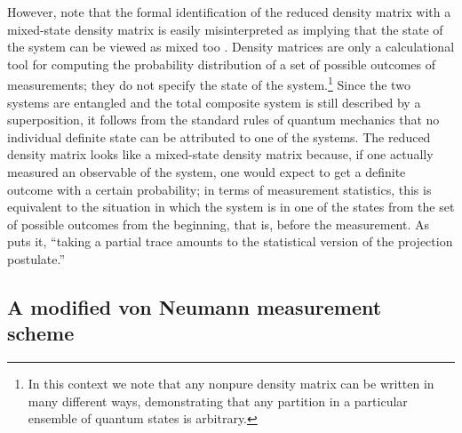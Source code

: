 \documentclass[rmp,aps,amsmath,amsfonts,noshowkeys,noshowpacs,12pt]{revtex4}
\begin{document}
However, note that the formal identification of the reduced density
matrix with a mixed-state density matrix is easily misinterpreted as
implying that the state of the system can be viewed as mixed too
\citep[see also the discussion by][]{Espagnat:1988:cf}.  Density
matrices are only a calculational tool for computing the probability
distribution of a set of possible outcomes of measurements; they do
not specify the state of the system.\footnote{In this context we note
  that any nonpure density matrix can be written in many different
  ways, demonstrating that any partition in a particular ensemble of
  quantum states is arbitrary.}  Since the two systems are entangled
and the total composite system is still described by a superposition,
it follows from the standard rules of quantum mechanics that no
individual definite state can be attributed to one of the systems. The
reduced density matrix looks like a mixed-state density matrix
because, if one actually measured an observable of the system, one
would expect to get a definite outcome with a certain probability; in
terms of measurement statistics, this is equivalent to the situation
in which the system is in one of the states from the set of possible
outcomes from the beginning, that is, before the measurement.  As
\citet[p.~432]{Pessoa:1998:yl} puts it, ``taking a partial trace
amounts to the statistical version of the projection postulate.''


\subsection{A modified von Neumann measurement scheme}
\end{document}
